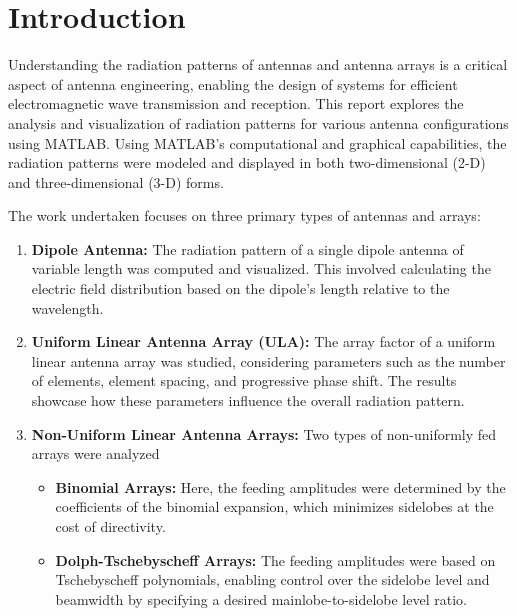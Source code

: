 \documentclass[a4paper, 12pt, english]{article}
\begin{document}

  \hypersetup{linkcolor=black}
  \tableofcontents

\newpage
\section{Introduction}
Understanding the radiation patterns of antennas and antenna arrays is a critical aspect of antenna engineering, enabling the design of systems for efficient electromagnetic wave transmission and reception. This report explores the analysis and visualization of radiation patterns for various antenna configurations using MATLAB. Using MATLAB's computational and graphical capabilities, the radiation patterns were modeled and displayed in both two-dimensional (2-D) and three-dimensional (3-D) forms. {\\}

\noindent
The work undertaken focuses on three primary types of antennas and arrays:

\begin{enumerate}
    \item \textbf{Dipole Antenna:} The radiation pattern of a single dipole antenna of variable length was computed and visualized. This involved calculating the electric field distribution based on the dipole's length relative to the wavelength.

    \item \textbf{Uniform Linear Antenna Array (ULA):} The array factor of a uniform linear antenna array was studied, considering parameters such as the number of elements, element spacing, and progressive phase shift. The results showcase how these parameters influence the overall radiation pattern.
    \item \textbf{Non-Uniform Linear Antenna Arrays:} Two types of non-uniformly fed arrays were analyzed
    \begin{itemize}
        \item \textbf{Binomial Arrays:} Here, the feeding amplitudes were determined by the coefficients of the binomial expansion, which minimizes sidelobes at the cost of directivity.
        \item \textbf{Dolph-Tschebyscheff Arrays:} The feeding amplitudes were based on Tschebyscheff polynomials, enabling control over the sidelobe level and beamwidth by specifying a desired mainlobe-to-sidelobe level ratio.
    \end{itemize}
\end{enumerate}
\end{document}
